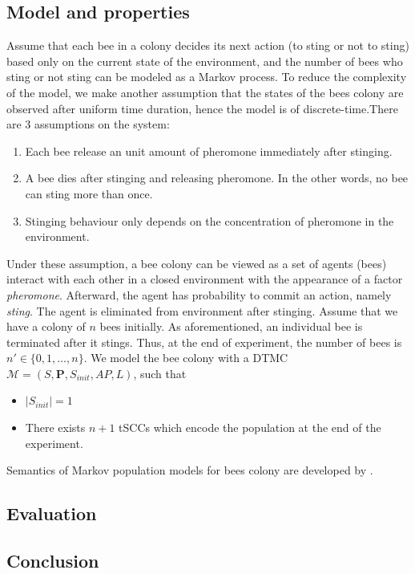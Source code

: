 \subsection{Model and properties}
Assume that each bee in a colony decides its next action (to sting or not to sting) based only on
the current state of the environment, and the number of bees who sting or not sting can be modeled
as a Markov process. To reduce the complexity of the model, we make another assumption that the
states of the bees colony are observed after uniform time duration, hence the model is of
discrete-time.There are 3 assumptions on the system:
\begin{enumerate}
    \item Each bee release an unit amount of pheromone immediately after stinging.
    \item A bee dies after stinging and releasing pheromone. In the other words, no bee can sting
          more than once.
    \item Stinging behaviour only depends on the concentration of pheromone in the environment.
\end{enumerate}
Under these assumption, a bee colony can be viewed as a set of agents (bees) interact with each
other in a closed environment with the appearance of a factor \textit{pheromone}. Afterward, the
agent has probability to commit an action, namely \textit{sting}. The agent is eliminated from
environment after stinging. Assume that we have a colony of $n$ bees initially. As aforementioned,
an individual bee is terminated after it stings. Thus, at the end of experiment, the number of bees
is $n'\in\{0,1,\ldots,n\}$. We model the bee colony with a DTMC $\mathcal{M}=(S,\mathbf{P},
S_{init}, AP,L)$, such that
\begin{itemize}
    \item $|S_{init}|=1$
    \item There exists $n+1$ tSCCs which encode the population at the end of the experiment.
\end{itemize}
Semantics of Markov population models for bees colony are developed by \cite{hajnal2019data}.
\subsection{Evaluation}
\subsection{Conclusion}

